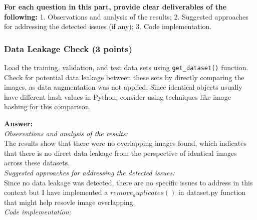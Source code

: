 \documentclass[11pt, oneside]{article}   	%
\begin{document}
\textbf{For each question in this part, provide clear deliverables of the following:} 1. Observations and analysis of the results; 2. Suggested approaches for addressing the detected issues (if any); 3. Code implementation.

\subsubsection*{Data Leakage Check (3 points)}
Load the training, validation, and test data sets using \texttt{get\_dataset()} function. Check for potential data leakage between these sets by directly comparing the images, as data augmentation was not applied. Since identical objects usually have different hash values in Python, consider using techniques like image hashing for this comparison.

\textbf{Answer:} 
\\
\textit{Observations and analysis of the results: }
\\
The results show that there were no overlapping images found, which indicates that there is no direct data leakage from the perspective of identical images across these datasets.
\\
\textit{Suggested approaches for addressing the detected issues: }
\\
Since no data leakage was detected, there are no specific issues to address in this context but I have implemented a $remove_duplicates()$ in dataset.py function that might help resovle image overlapping.
\\
\textit{Code implementation: }
\end{document}
